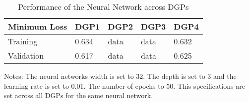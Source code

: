 

\begin{table}[]
\centering
\begin{threeparttable}
\caption{Performance of the Neural Network across DGPs}
\label{tab:table2}
\begin{tabular}{@{}lllll@{}}
\toprule
\addlinespace
Minimum Loss                & DGP1 & DGP2 & DGP3 & DGP4 \\ \midrule
Training    & 0.634 & data & data & 0.632 \\
Validation  & 0.617 & data & data & 0.625 \\ \bottomrule
\end{tabular}
\begin{tablenotes}
    \item Notes: The neural networks width is set to 32. The depth is set to 3 and the learning rate is set to 0.01. The number of epochs to 50. This specifications are set across all DGPs for the same neural network.
\end{tablenotes}
\end{threeparttable}
\end{table}
